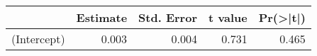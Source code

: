 
\begin{tabular}{l|r|r|r|r}
\hline
  & Estimate & Std. Error & t value & Pr(>|t|)\\
\hline
(Intercept) & 0.003 & 0.004 & 0.731 & 0.465\\
\hline
\end{tabular}
